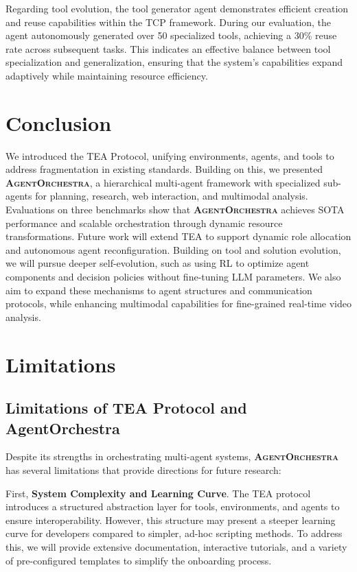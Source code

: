 \documentclass[11pt]{article}
\newcommand{\projectname}{\textbf{\textsc{AgentOrchestra}}\xspace}
\begin{document}
Regarding tool evolution, the tool generator agent demonstrates efficient creation and reuse capabilities within the TCP framework. During our evaluation, the agent autonomously generated over 50 specialized tools, achieving a 30\% reuse rate across subsequent tasks. This indicates an effective balance between tool specialization and generalization, ensuring that the system's capabilities expand adaptively while maintaining resource efficiency.

\section{Conclusion}
\label{sec:conclusion}
We introduced the TEA Protocol, unifying environments, agents, and tools to address fragmentation in existing standards. Building on this, we presented \projectname, a hierarchical multi-agent framework with specialized sub-agents for planning, research, web interaction, and multimodal analysis. Evaluations on three benchmarks show that \projectname achieves SOTA performance and scalable orchestration through dynamic resource transformations. Future work will extend TEA to support dynamic role allocation and autonomous agent reconfiguration. Building on tool and solution evolution, we will pursue deeper self-evolution, such as using RL to optimize agent components and decision policies without fine-tuning LLM parameters. We also aim to expand these mechanisms to agent structures and communication protocols, while enhancing multimodal capabilities for fine-grained real-time video analysis.


\newpage
\section{Limitations}

\subsection{Limitations of TEA Protocol and AgentOrchestra}

Despite its strengths in orchestrating multi-agent systems, \projectname has several limitations that provide directions for future research:

First, \textbf{System Complexity and Learning Curve}. The TEA protocol introduces a structured abstraction layer for tools, environments, and agents to ensure interoperability. However, this structure may present a steeper learning curve for developers compared to simpler, ad-hoc scripting methods. To address this, we will provide extensive documentation, interactive tutorials, and a variety of pre-configured templates to simplify the onboarding process.
\end{document}
